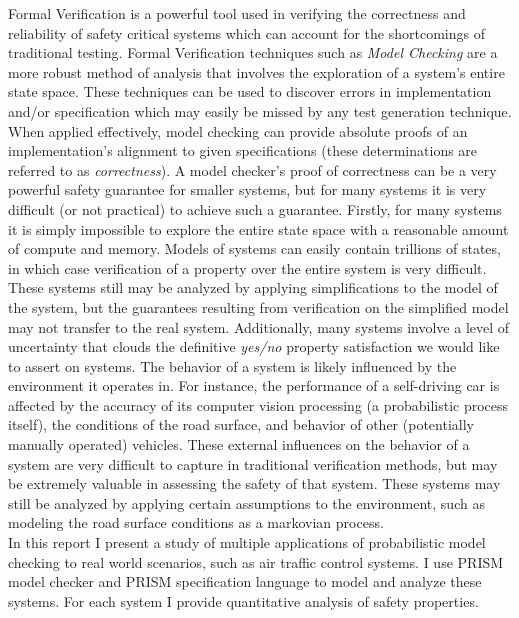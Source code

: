 \documentclass{article}
\begin{document}
Formal Verification is a powerful tool used in verifying the correctness and reliability of safety critical systems which can account for the shortcomings of traditional testing. Formal Verification techniques such as \textit{Model Checking} are a more robust method of analysis that involves the exploration of a system's entire state space. These techniques can be used to discover errors in implementation and/or specification which may easily be missed by any test generation technique. When applied effectively, model checking can provide absolute proofs of an implementation's alignment to given specifications (these determinations are referred to as \textit{correctness}). A model checker's proof of correctness can be a very powerful safety guarantee for smaller systems, but for many systems it is very difficult (or not practical) to achieve such a guarantee. Firstly, for many systems it is simply impossible to explore the entire state space with a reasonable amount of compute and memory. 
Models of systems can easily contain trillions of states, in which case verification of a property over the entire system is very difficult. These systems still may be analyzed by applying simplifications to the model of the system, but the guarantees resulting from verification on the simplified model may not transfer to the real system.
Additionally, many systems involve a level of uncertainty that clouds the definitive \textit{yes/no} property satisfaction we would like to assert on systems. The behavior of a system is likely influenced by the environment it operates in. For instance, the performance of a self-driving car is affected by the accuracy of its computer vision processing (a probabilistic process itself), the conditions of the road surface, and behavior of other (potentially manually operated) vehicles. These external influences on the behavior of a system are very difficult to capture in traditional verification methods, but may be extremely valuable in assessing the safety of that system. These systems may still be analyzed by applying certain assumptions to the environment, such as modeling the road surface conditions as a markovian process.\\

In this report I present a study of multiple applications of probabilistic model checking to real world scenarios, such as air traffic control systems. I use PRISM model checker and PRISM specification language to model and analyze these systems. For each system I provide quantitative analysis of safety properties.\\
\end{document}

